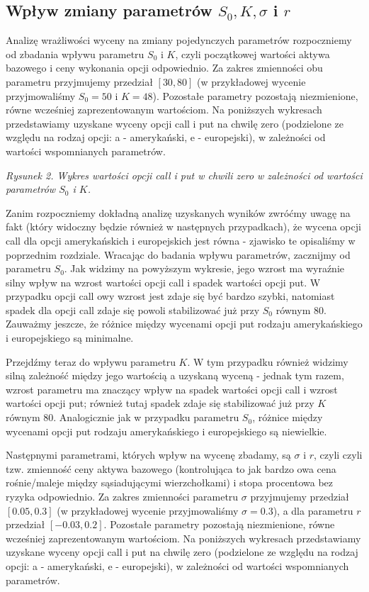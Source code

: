 \documentclass[
]{article}
\begin{document}
\hypertarget{wpux142yw-zmiany-parametruxf3w-s_0-k-sigma-i-r}{%
\subsection{\texorpdfstring{Wpływ zmiany parametrów \(S_0, K, \sigma\) i
\(r\)}{Wpływ zmiany parametrów S\_0, K, \textbackslash sigma i r}}\label{wpux142yw-zmiany-parametruxf3w-s_0-k-sigma-i-r}}

Analizę wrażliwości wyceny na zmiany pojedynczych parametrów
rozpoczniemy od zbadania wpływu parametru \(S_0\) i \(K\), czyli
początkowej wartości aktywa bazowego i ceny wykonania opcji odpowiednio.
Za zakres zmienności obu parametru przyjmujemy przedział \([30, 80]\) (w
przykładowej wycenie przyjmowaliśmy \(S_0 = 50\) i \(K = 48\)).
Pozostałe parametry pozostają niezmienione, równe wcześniej
zaprezentowanym wartościom. Na poniższych wykresach przedstawiamy
uzyskane wyceny opcji call i put na chwilę zero (podzielone ze względu
na rodzaj opcji: a - amerykański, e - europejski), w zależności od
wartości wspomnianych parametrów.

\emph{Rysunek 2. Wykres wartości opcji call i put w chwili zero w
zależności od wartości parametrów \(S_0\) i \(K\).}

Zanim rozpoczniemy dokładną analizę uzyskanych wyników zwróćmy uwagę na
fakt (który widoczny będzie również w następnych przypadkach), że wycena
opcji call dla opcji amerykańskich i europejskich jest równa - zjawisko
te opisaliśmy w poprzednim rozdziale. Wracając do badania wpływu
parametrów, zacznijmy od parametru \(S_0\). Jak widzimy na powyższym
wykresie, jego wzrost ma wyraźnie silny wpływ na wzrost wartości opcji
call i spadek wartości opcji put. W przypadku opcji call owy wzrost jest
zdaje się być bardzo szybki, natomiast spadek dla opcji call zdaje się
powoli stabilizować już przy \(S_0\) równym \(80\). Zauważmy jeszcze, że
różnice między wycenami opcji put rodzaju amerykańskiego i europejskiego
są minimalne.

Przejdźmy teraz do wpływu parametru \(K\). W tym przypadku również
widzimy silną zależność między jego wartością a uzyskaną wyceną - jednak
tym razem, wzrost parametru ma znaczący wpływ na spadek wartości opcji
call i wzrost wartości opcji put; również tutaj spadek zdaje się
stabilizować już przy \(K\) równym \(80\). Analogicznie jak w przypadku
parametru \(S_0\), różnice między wycenami opcji put rodzaju
amerykańskiego i europejskiego są niewielkie.

Następnymi parametrami, których wpływ na wycenę zbadamy, są \(\sigma\) i
\(r\), czyli czyli tzw. zmienność ceny aktywa bazowego (kontrolująca to
jak bardzo owa cena rośnie/maleje między sąsiadującymi wierzchołkami) i
stopa procentowa bez ryzyka odpowiednio. Za zakres zmienności parametru
\(\sigma\) przyjmujemy przedział \([0.05, 0.3]\) (w przykładowej wycenie
przyjmowaliśmy \(\sigma = 0.3\)), a dla parametru \(r\) przedział
\([-0.03, 0.2]\). Pozostałe parametry pozostają niezmienione, równe
wcześniej zaprezentowanym wartościom. Na poniższych wykresach
przedstawiamy uzyskane wyceny opcji call i put na chwilę zero
(podzielone ze względu na rodzaj opcji: a - amerykański, e -
europejski), w zależności od wartości wspomnianych parametrów.
\end{document}
